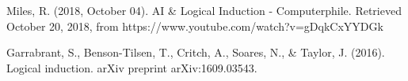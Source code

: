 \documentclass{article}
\begin{document}
 \begin{thebibliography}{9}
 
Miles, R. (2018, October 04). AI \& Logical Induction - Computerphile. Retrieved October 20, 2018, from https://www.youtube.com/watch?v=gDqkCxYYDGk

Garrabrant, S., Benson-Tilsen, T., Critch, A., Soares, N., \& Taylor, J. (2016). Logical induction. arXiv preprint arXiv:1609.03543.

\end{thebibliography}
\end{document}
